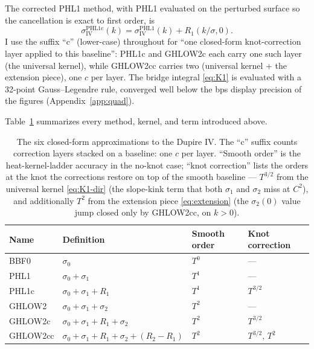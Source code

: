 \documentclass[11pt]{article}
\newcommand{\siv}{\sigma_{\mathrm{IV}}}
\begin{document}
The corrected PHL1 method, with PHL1 evaluated on the perturbed surface
so the cancellation is exact to first order, is
\begin{equation}
\siv^{\mathrm{PHL1c}}(k)=\siv^{\mathrm{PHL1}}(k)+R_{1}(k/\sigma, 0).
\end{equation}
I use the suffix ``c'' (lower-case) throughout for ``one closed-form
knot-correction layer applied to this baseline'': PHL1c and GHLOW2c
each carry one such layer (the universal kernel), while GHLOW2cc
carries two (universal kernel + the extension piece), one $c$
per layer.
The bridge integral \eqref{eq:K1} is evaluated with a 32-point
Gauss--Legendre rule, converged well below the bps display precision of
the figures (Appendix~\ref{app:quad}).

Table~\ref{tab:summary} summarizes every method, kernel, and term
introduced above.

\begin{table}[h]
\centering
\begin{tabular}{llll}
\toprule
Name      & Definition                                              & Smooth order & Knot correction \\
\midrule
BBF0      & $\sigma_0$                                              & $T^{0}$ & --- \\
PHL1      & $\sigma_0 + \sigma_1$                                   & $T^{1}$ & --- \\
PHL1c     & $\sigma_0 + \sigma_1 + R_{1}$                           & $T^{1}$ & $T^{3/2}$ \\
GHLOW2    & $\sigma_0 + \sigma_1 + \sigma_2$                        & $T^{2}$ & --- \\
GHLOW2c   & $\sigma_0 + \sigma_1 + R_{1} + \sigma_2$                & $T^{2}$ & $T^{3/2}$ \\
GHLOW2cc  & $\sigma_0 + \sigma_1 + R_{1} + \sigma_2 + (R_{2} - R_{1})$ & $T^{2}$ & $T^{3/2},\,T^{2}$ \\
\bottomrule
\end{tabular}
\caption{The six closed-form approximations to the Dupire IV. The ``c''
suffix counts correction layers stacked on a baseline: one $c$ per
layer. ``Smooth order'' is the heat-kernel-ladder accuracy in the
no-knot case; ``knot correction'' lists the orders at the knot the
corrections restore on top of the smooth baseline --- $T^{3/2}$ from
the universal kernel \eqref{eq:K1-dir} (the slope-kink term that
both $\sigma_1$ and $\sigma_2$ miss at $C^{2}$), and additionally $T^{2}$ from the
extension piece \eqref{eq:extension} (the $\sigma_2(0)$ value jump
closed only by GHLOW2cc, on $k>0$).}
\label{tab:summary}
\end{table}
\end{document}
